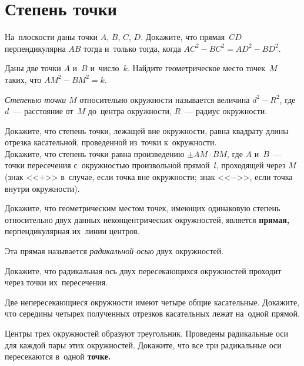 
\section*{Степень точки}


\begin{problems}

\item
На~плоскости даны точки $A$, $B$, $C$, $D$.
Докажите, что прямая~$CD$ перпендикулярна $AB$ тогда и~только тогда, когда
$AC^2 - BC^2 = AD^2 - BD^2$.

\item
Даны две точки $A$ и~$B$ и~число~$k$.
Найдите геометрическое место точек~$M$ таких, что $AM^2 - BM^2 = k$.

\end{problems}

\emph{Степенью точки} $M$ относительно окружности называется величина
$d^2 - R^2$, где $d$~--- расстояние от~$M$ до~центра окружности,
$R$~--- радиус окружности.

\begin{problems}

\item
\sp
Докажите, что степень точки, лежащей вне окружности, равна квадрату длины
отрезка касательной, проведенной из~точки к~окружности.
\\
\sp
Докажите, что степень точки равна произведению $\pm AM \cdot BM$, где
$A$ и~$B$~--- точки пересечения с~окружностью произвольной прямой~$l$,
проходящей через $M$ (знак <<$+$>> в~случае, если точка вне окружности;
знак <<$-$>>, если точка внутри окружности).

\item
Докажите, что геометрическим местом точек, имеющих одинаковую степень
относительно двух данных неконцентрических окружностей, является
\textbf{прямая,} перпендикулярная их~линии центров.

\end{problems}

Эта прямая называется \emph{радикальной осью} двух окружностей.

Докажите, что радикальная ось двух пересекающихся окружностей проходит через точки их~пересечения.

\begin{problems}

\item
Две непересекающиеся окружности имеют четыре общие касательные.
Докажите, что середины четырех полученных отрезков касательных лежат на~одной
прямой.

\item
Центры трех окружностей образуют треугольник.
Проведены радикальные оси для каждой пары этих окружностей.
Докажите, что все три радикальные оси пересекаются в~одной \textbf{точке.}

\end{problems}

